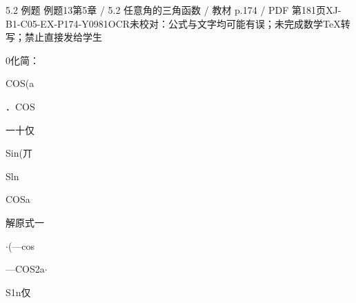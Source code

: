\begin{bankitem}{5.2 例题 例题13}{第5章 / 5.2 任意角的三角函数 / 教材 p.174 / PDF 第181页}{XJ-B1-C05-EX-P174-Y0981}{OCR未校对：公式与文字均可能有误；未完成数学TeX转写；禁止直接发给学生}
\begin{ocrdraft}
\par
0化简：
\par
COS(a
\par
．COS
\par
一十仅
\par
Sin(丌
\par
Sln
\par
COSa
\par
解原式一
\par
\ensuremath{\cdot}(—cos
\par
—COS2a\ensuremath{\cdot}
\par
S1n仅
\end{ocrdraft}
\end{bankitem}
